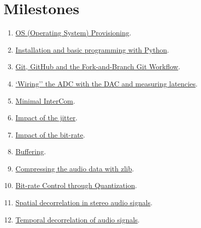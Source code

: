 \section{Milestones}
\begin{enumerate}
\item \href{https://tecnologias-multimedia.github.io/study_guide/provisioning/}{OS (Operating System) Provisioning}.
\item \href{https://tecnologias-multimedia.github.io/study_guide/python/}{Installation and basic programming with Python}.
\item \href{https://tecnologias-multimedia.github.io/study_guide/git/}{Git, GitHub and the Fork-and-Branch Git Workflow}.
\item \href{https://tecnologias-multimedia.github.io/study_guide/wiring/}{`Wiring'' the ADC with the DAC and measuring latencies}.
\item \href{https://tecnologias-multimedia.github.io/study_guide/minimal/}{Minimal InterCom}.
\item \href{https://tecnologias-multimedia.github.io/study_guide/jitter_impact/}{Impact of the jitter}.
\item \href{https://tecnologias-multimedia.github.io/study_guide/bit-rate_impact/}{Impact of the bit-rate}.
\item \href{https://tecnologias-multimedia.github.io/study_guide/buffering/}{Buffering}.
\item \href{https://tecnologias-multimedia.github.io/study_guide/compress/}{Compressing the audio data with zlib}.
\item \href{https://tecnologias-multimedia.github.io/study_guide/quantization/}{Bit-rate Control through Quantization}.
\item \href{https://tecnologias-multimedia.github.io/study_guide/spatial_decorrelation/}{Spatial decorrelation in stereo audio signals}.
\item \href{https://tecnologias-multimedia.github.io/study_guide/temporal_decorrelation/}{Temporal decorrelation of audio signals}.
\end{enumerate}

